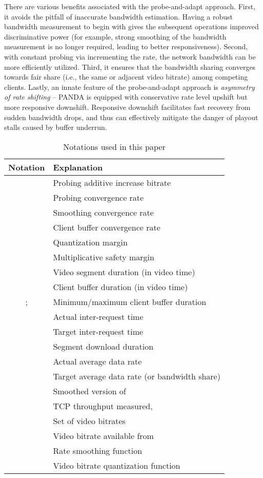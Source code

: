 \documentclass[conference]{IEEEtran}
\providecommand{\tabularnewline}{\\}
\theoremstyle{plain}
\theoremstyle{definition}
\theoremstyle{plain}
\theoremstyle{plain}
\providecommand{\tabularnewline}{\\}
\begin{document}
There are various benefits associated with the probe-and-adapt approach.
First, it avoids the pitfall of inaccurate bandwidth estimation. Having
a robust bandwidth measurement to begin with gives the subsequent
operations improved discriminative power (for example, strong smoothing
of the bandwidth measurement is no longer required, leading to better
responsiveness). Second, with constant probing via incrementing the
rate, the network bandwidth can be more efficiently utilized. Third,
it ensures that the bandwidth sharing converges towards fair share
(i.e., the same or adjacent video bitrate) among competing clients.
Lastly, an innate feature of the probe-and-adapt approach is \emph{asymmetry
of rate shifting} -- PANDA is equipped with conservative rate level
upshift but more responsive downshift. Responsive downshift facilitates
fast recovery from sudden bandwidth drops, and thus can effectively
mitigate the danger of playout stalls caused by buffer underrun.

\begin{center}
\begin{table}[t]
\centering\scriptsize \begin{minipage}[t]{0.99\columnwidth}\begin{center}
{\small }\begin{tabular}{|c|l|}
\hline 
{\small Notation } & {\small Explanation}\tabularnewline
\hline 
{\small  } & {\small Probing additive increase bitrate }\tabularnewline
{\small  } & {\small Probing convergence rate}\tabularnewline
{\small  } & {\small Smoothing convergence rate}\tabularnewline
 & {\small Client buffer convergence rate}\tabularnewline
{\small } & {\small Quantization margin}\tabularnewline
 & {\small Multiplicative safety margin}\tabularnewline
{\small  } & {\small Video segment duration (in video time)}\tabularnewline
{\small  } & {\small Client buffer duration (in video time)}\tabularnewline
{\small ;  } & {\small Minimum/maximum client buffer duration}\tabularnewline
{\small  } & {\small Actual inter-request time}\tabularnewline
{\small  } & {\small Target inter-request time}\tabularnewline
{\small  } & {\small Segment download duration}\tabularnewline
{\small  } & {\small Actual average data rate}\tabularnewline
{\small  } & {\small Target average data rate (or bandwidth share)}\tabularnewline
{\small  } & {\small Smoothed version of }\tabularnewline
{\small  } & {\small TCP throughput measured, }\tabularnewline
{\small  } & {\small Set of video bitrates }\tabularnewline
{\small  } & {\small Video bitrate available from }\tabularnewline
 & {\small Rate smoothing function}\tabularnewline
 & {\small Video bitrate quantization function}\tabularnewline
\hline 
\end{tabular}
\par\end{center}\end{minipage}\caption{\label{tab:notation}Notations used in this paper}
\vspace{-0.15in}
\end{table}

\par\end{center}
\end{document}
